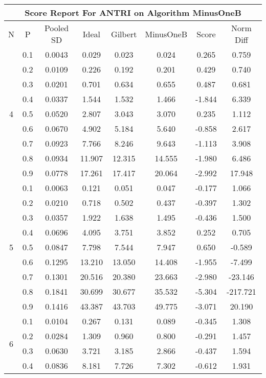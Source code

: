 \documentclass[11pt,a4paper]{report}
\begin{document}
\begin{longtable}{ | c | c || c | c | c | c | c | c | }
\hline
\multicolumn{8}{|c|}{ Score Report For ANTRI on Algorithm MinusOneB} \\
\hline
N & P & Pooled SD &  Ideal &  Gilbert & MinusOneB  & Score & Norm Diff \\
 \hline
 \hline
 \endhead
\multirow{9}{*}{4} & 0.1 & 0.0043 & 0.029 & 0.023 & 0.024 & 0.265 & 0.759 \\
 & 0.2 & 0.0109 & 0.226 & 0.192 & 0.201 & 0.429 & 0.740 \\
 & 0.3 & 0.0201 & 0.701 & 0.634 & 0.655 & 0.487 & 0.681 \\
 & 0.4 & 0.0337 & 1.544 & 1.532 & 1.466 & -1.844 & 6.339 \\
 & 0.5 & 0.0520 & 2.807 & 3.043 & 3.070 & 0.235 & 1.112 \\
 & 0.6 & 0.0670 & 4.902 & 5.184 & 5.640 & -0.858 & 2.617 \\
 & 0.7 & 0.0923 & 7.766 & 8.246 & 9.643 & -1.113 & 3.908 \\
 & 0.8 & 0.0934 & 11.907 & 12.315 & 14.555 & -1.980 & 6.486 \\
 & 0.9 & 0.0778 & 17.261 & 17.417 & 20.064 & -2.992 & 17.948 \\
 \hline
\multirow{9}{*}{5} & 0.1 & 0.0063 & 0.121 & 0.051 & 0.047 & -0.177 & 1.066 \\
 & 0.2 & 0.0210 & 0.718 & 0.502 & 0.437 & -0.397 & 1.302 \\
 & 0.3 & 0.0357 & 1.922 & 1.638 & 1.495 & -0.436 & 1.500 \\
 & 0.4 & 0.0696 & 4.095 & 3.751 & 3.852 & 0.252 & 0.705 \\
 & 0.5 & 0.0847 & 7.798 & 7.544 & 7.947 & 0.650 & -0.589 \\
 & 0.6 & 0.1295 & 13.210 & 13.050 & 14.408 & -1.955 & -7.499 \\
 & 0.7 & 0.1301 & 20.516 & 20.380 & 23.663 & -2.980 & -23.146 \\
 & 0.8 & 0.1841 & 30.699 & 30.677 & 35.532 & -5.304 & -217.721 \\
 & 0.9 & 0.1416 & 43.387 & 43.703 & 49.775 & -3.071 & 20.190 \\
 \hline
\multirow{9}{*}{6} & 0.1 & 0.0104 & 0.267 & 0.131 & 0.089 & -0.345 & 1.308 \\
 & 0.2 & 0.0284 & 1.309 & 0.960 & 0.800 & -0.291 & 1.457 \\
 & 0.3 & 0.0630 & 3.721 & 3.185 & 2.866 & -0.437 & 1.594 \\
 & 0.4 & 0.0836 & 8.181 & 7.726 & 7.302 & -0.612 & 1.931 \\

\end{longtable}
\end{document}
